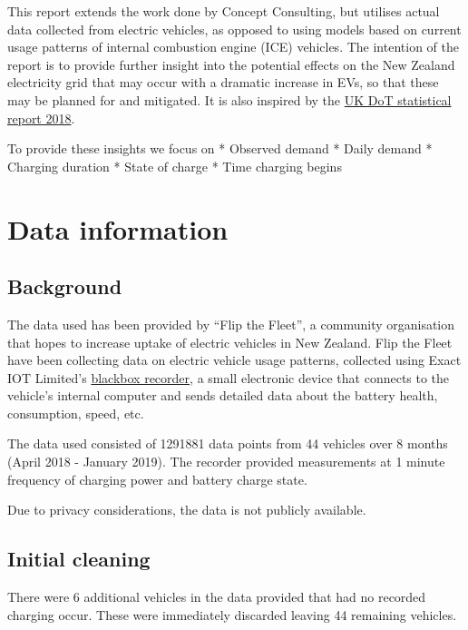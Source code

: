 \documentclass[]{article}
\begin{document}
This report extends the work done by Concept Consulting, but utilises
actual data collected from electric vehicles, as opposed to using models
based on current usage patterns of internal combustion engine (ICE)
vehicles. The intention of the report is to provide further insight into
the potential effects on the New Zealand electricity grid that may occur
with a dramatic increase in EVs, so that these may be planned for and
mitigated. It is also inspired by the
\href{https://assets.publishing.service.gov.uk/government/uploads/system/uploads/attachment_data/file/764270/electric-chargepoint-analysis-2017-domestics.pdf}{UK
DoT statistical report 2018}.

To provide these insights we focus on * Observed demand * Daily demand *
Charging duration * State of charge * Time charging begins

\section{Data information}\label{data}

\subsection{Background}\label{background}

The data used has been provided by ``Flip the Fleet'', a community
organisation that hopes to increase uptake of electric vehicles in New
Zealand. Flip the Fleet have been collecting data on electric vehicle
usage patterns, collected using Exact IOT Limited's
\href{https://flipthefleet.org/ev-black-box/}{blackbox recorder}, a
small electronic device that connects to the vehicle's internal computer
and sends detailed data about the battery health, consumption, speed,
etc.

The data used consisted of 1291881 data points from 44 vehicles over 8
months (April 2018 - January 2019). The recorder provided measurements
at 1 minute frequency of charging power and battery charge state.

Due to privacy considerations, the data is not publicly available.

\subsection{Initial cleaning}\label{initial-cleaning}

There were 6 additional vehicles in the data provided that had no
recorded charging occur. These were immediately discarded leaving 44
remaining vehicles.
\end{document}

